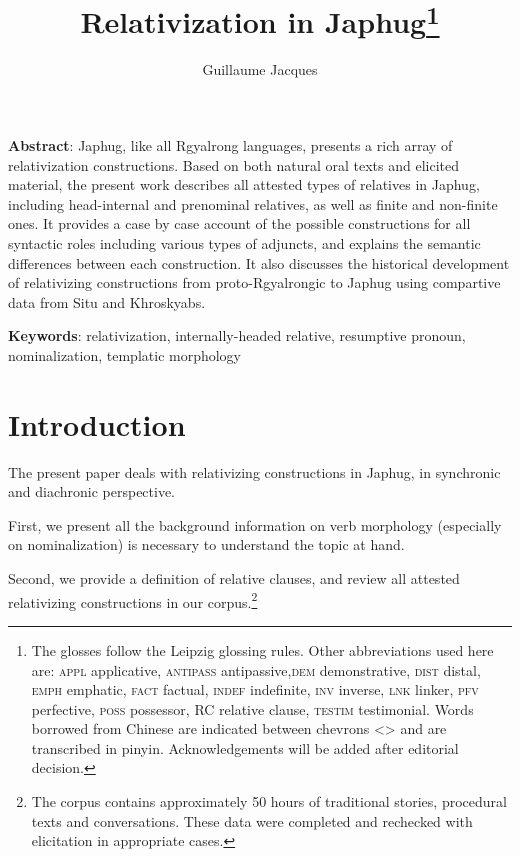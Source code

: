 \documentclass[oldfontcommands,oneside,a4paper,11pt]{article}
\begin{document}
 

\title{Relativization in Japhug\footnote{
The glosses follow the Leipzig glossing rules. Other abbreviations used here are: \textsc{appl} applicative, \textsc{antipass} antipassive,\textsc{dem} demonstrative, \textsc{dist} distal, \textsc{emph} emphatic, \textsc{fact} factual, \textsc{indef} indefinite, \textsc{inv} inverse,  \textsc{lnk} linker, \textsc{pfv} perfective, \textsc{poss} possessor, RC relative clause, \textsc{testim} testimonial. Words borrowed from Chinese are indicated between chevrons <> and are transcribed in pinyin. %
Acknowledgements will be added after editorial decision. %
} }
\author{Guillaume Jacques}
\maketitle
\linenumbers
\textbf{Abstract}: Japhug, like all Rgyalrong languages, presents a rich array of relativization constructions. Based on both natural oral texts and elicited material, the present work  describes all attested types of relatives in Japhug, including head-internal and prenominal relatives, as well as finite and non-finite ones. It provides a case by case account of the possible constructions for all syntactic roles including various types of adjuncts, and explains the semantic differences between each construction. It also discusses the historical development of relativizing constructions from proto-Rgyalrongic to Japhug using compartive data from Situ and Khroskyabs.



\textbf{Keywords}: relativization, internally-headed relative, resumptive pronoun, nominalization, templatic morphology
\section{Introduction}
The present paper deals with relativizing constructions in Japhug, in synchronic and diachronic perspective.

First, we present all the background information on verb morphology (especially on nominalization) is necessary to understand the topic at hand.

Second, we provide a  definition of relative clauses, and review all attested relativizing constructions in our corpus.\footnote{The corpus contains approximately 50 hours of traditional stories, procedural texts and conversations. These data were completed and rechecked with elicitation in appropriate cases. }
\end{document}
